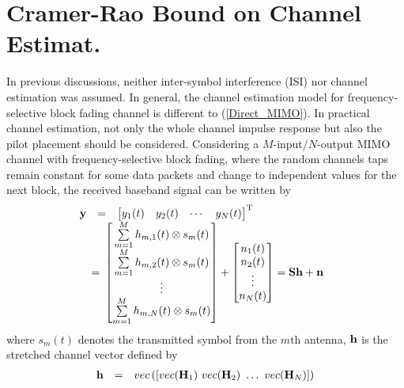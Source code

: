 \documentclass[conference]{IEEEtran}
\newcommand{\bh}{{\bf h}}
\newcommand{\bH}{{\bf H}}
\newcommand{\bn}{{\bf n}}
\newcommand{\by}{{\bf y}}
\newcommand{\bS}{{\bf S}}
\begin{document}
\section{Cramer-Rao Bound on Channel Estimat.}
In previous discussions, neither inter-symbol interference (ISI)
nor channel estimation was assumed. In general, the channel
estimation model for frequency-selective block fading channel is
different to (\ref{Direct_MIMO}). In practical channel estimation,
not only the whole channel impulse response but also the pilot
placement should be considered. Considering a $M$-input/$N$-output
MIMO channel with frequency-selective block fading, where the
random channels taps remain constant for some data packets and
change to independent values for the next block, the received
baseband signal can be written by
\begin{equation}\hspace{-0.10in}
\begin{array}{rcl}
\by&=&\left[\begin{matrix}y_{1}(t)&y_{2}(t)&\cdots&y_{N}(t)\end{matrix}\right]^{\rm T}\\
&\hspace{-0.15in}=&\hspace{-0.15in}\left[\begin{matrix}\sum\limits_{m=1}^{M}h_{m,1}(t)\otimes s_m(t)\\ \sum\limits_{m=1}^{M}h_{m,2}(t)\otimes s_m(t)\\ \vdots \\
\sum\limits_{m=1}^{M}h_{m,N}(t)\otimes
s_m(t)\end{matrix}\right]+\left[\begin{matrix}n_{1}(t)\\ n_{2}(t)\\ \vdots\\
n_{N}(t)\end{matrix}\right]=\bS\bh+\bn
\end{array}
\end{equation}
\noindent where $s_m(t)$ denotes the transmitted symbol from the
$m$th antenna, $\bh$ is the stretched channel vector defined by
\begin{equation}\hspace{-0.00in}
\begin{array}{rcl}
\bh&=&\mbox{vec}\left(\left[\mbox{vec}(\bH_{1})\
\mbox{vec}(\bH_{2})\ \ldots\ \mbox{vec}(\bH_{N})\right]\right)
\end{array}
\end{equation}
\end{document}
